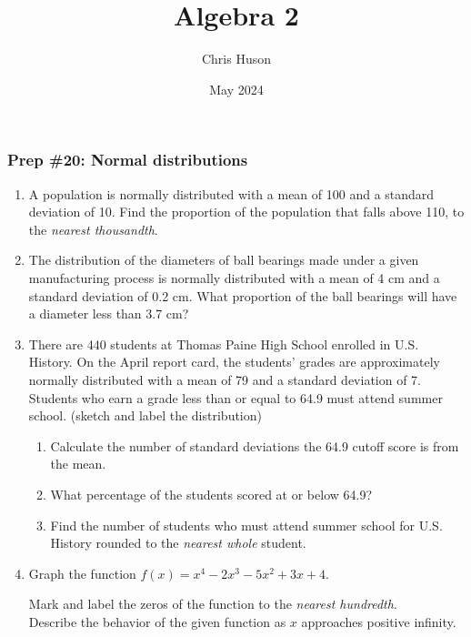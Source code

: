 \documentclass[12pt, twoside]{article}
\title{Algebra 2}
\author{Chris Huson}
\date{May 2024}
\begin{document}
\subsubsection*{Prep \#20: Normal distributions}
\begin{enumerate}[itemsep=0.5cm]
\item A population is normally distributed with a mean of 100 and a standard deviation of 10. Find the proportion of the population that falls above 110, to the \emph{nearest thousandth}. \vspace{3cm}

\item The distribution of the diameters of ball bearings made under a given manufacturing process is normally distributed with a mean of 4 cm and a standard deviation of 0.2 cm. What proportion of the ball bearings will have a diameter less than 3.7 cm?\vspace{4cm}

\item There are 440 students at Thomas Paine High School enrolled in U.S. History. On the April report card, the students' grades are approximately normally distributed with a mean of 79 and a standard deviation of 7. Students who earn a grade less than or equal to 64.9 must attend summer school. (sketch and label the distribution)  \begin{enumerate}
    \item Calculate the number of standard deviations the 64.9 cutoff score is from the mean. \vspace{1cm}
    \item What percentage of the students scored at or below 64.9? \vspace{2cm}
    \item Find the number of students who must attend summer school for U.S. History rounded to the \emph{nearest whole} student.
\end{enumerate} \vspace{2cm}


\newpage
\item Graph the function $f(x) = x^4-2x^{3}-5x^{2}+3x+4$. 
\begin{center}
    \end{center}
Mark and label the zeros of the function to the \emph{nearest hundredth}. \\[2cm]
Describe the behavior of the given function as $x$ approaches positive infinity.


\end{enumerate}
\end{document}
